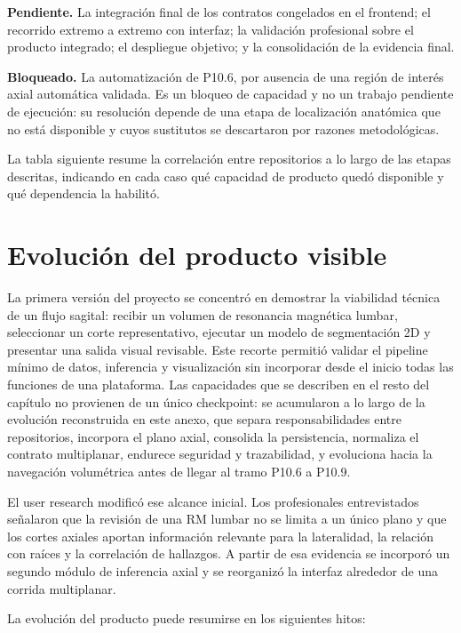 \textbf{Pendiente.} La integración final de los contratos congelados en el frontend; el recorrido extremo a extremo con interfaz; la validación profesional sobre el producto integrado; el despliegue objetivo; y la consolidación de la evidencia final.

\textbf{Bloqueado.} La automatización de P10.6, por ausencia de una región de interés axial automática validada. Es un bloqueo de capacidad y no un trabajo pendiente de ejecución: su resolución depende de una etapa de localización anatómica que no está disponible y cuyos sustitutos se descartaron por razones metodológicas.

La tabla siguiente resume la correlación entre repositorios a lo largo de las etapas descritas, indicando en cada caso qué capacidad de producto quedó disponible y qué dependencia la habilitó.

\section{Evolución del producto visible}
\label{anexo:f-evolucion-producto-visible}

La primera versión del proyecto se concentró en demostrar la viabilidad técnica de un flujo sagital: recibir un volumen de resonancia magnética lumbar, seleccionar un corte representativo, ejecutar un modelo de segmentación 2D y presentar una salida visual revisable. Este recorte permitió validar el pipeline mínimo de datos, inferencia y visualización sin incorporar desde el inicio todas las funciones de una plataforma. Las capacidades que se describen en el resto del capítulo no provienen de un único checkpoint: se acumularon a lo largo de la evolución reconstruida en este anexo, que separa responsabilidades entre repositorios, incorpora el plano axial, consolida la persistencia, normaliza el contrato multiplanar, endurece seguridad y trazabilidad, y evoluciona hacia la navegación volumétrica antes de llegar al tramo P10.6 a P10.9.

El user research modificó ese alcance inicial. Los profesionales entrevistados señalaron que la revisión de una RM lumbar no se limita a un único plano y que los cortes axiales aportan información relevante para la lateralidad, la relación con raíces y la correlación de hallazgos. A partir de esa evidencia se incorporó un segundo módulo de inferencia axial y se reorganizó la interfaz alrededor de una corrida multiplanar.

La evolución del producto puede resumirse en los siguientes hitos:

